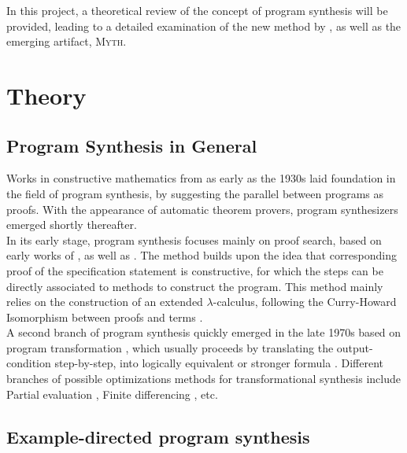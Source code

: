 \documentclass[preprint, 11pt]{sigplanconf}
\begin{document}
In this project, a theoretical review of the concept of program synthesis will be provided, leading to a detailed examination of the new method by \citet{osera2015type}, as well as the emerging artifact, \textsc{Myth}. \\

\section{Theory}\label{sec-theo}

\subsection{Program Synthesis in General}\label{sec-prog}

Works in constructive mathematics from as early as the 1930s \cite{kolmogorov1932theory}\cite{kreitz1998program} laid foundation in the field of program synthesis, by suggesting the parallel between programs as proofs. With the appearance of automatic theorem provers, program synthesizers emerged shortly thereafter\cite{kreitz1998program}. \\

In its early stage, program synthesis focuses mainly on proof search, based on early works of \citet{green1969application}, as well as \citet{manna1971toward}. The method builds upon the idea that corresponding proof of the specification statement is constructive, for which the steps can be directly associated to methods to construct the program. This method mainly relies on the construction of an extended $\lambda$-calculus, following the Curry-Howard Isomorphism between proofs and terms \cite{curry1972combinatory} \cite{tait1967intensional}.\\

A second branch of program synthesis quickly emerged in the late 1970s based on program transformation \cite{burstall1977transformation}, which usually proceeds by translating the output-condition step-by-step, into logically equivalent or stronger formula \cite{kreitz1998program}. Different branches of possible optimizations methods for transformational synthesis include Partial evaluation \cite{bjorner1988partial}, Finite differencing \cite{paige1982finite}, etc.\\

\subsection{Example-directed program synthesis}\label{sec-exam}
\end{document}
